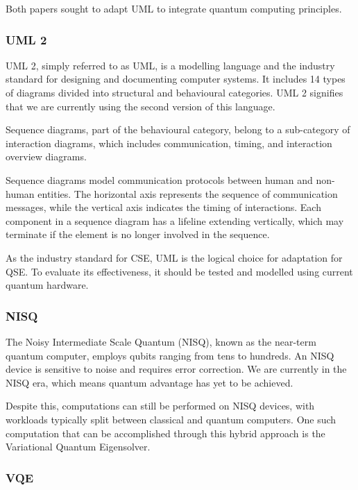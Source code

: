 \documentclass{article}
\newcounter{subsubsubsection}[subsubsection]
\begin{document}
Both papers sought to adapt UML to integrate quantum computing principles. 

\subsubsection{UML 2}

UML 2, simply referred to as UML, is a modelling language and the industry standard for designing and documenting computer systems. It includes 14 types of diagrams divided into structural and behavioural categories. UML 2 signifies that we are currently using the second version of this language. 

Sequence diagrams, part of the behavioural category, belong to a sub-category of interaction diagrams, which includes communication, timing, and interaction overview diagrams.

Sequence diagrams model communication protocols between human and non-human entities. The horizontal axis represents the sequence of communication messages, while the vertical axis indicates the timing of interactions. Each component in a sequence diagram has a lifeline extending vertically, which may terminate if the element is no longer involved in the sequence. 

As the industry standard for CSE, UML is the logical choice for adaptation for QSE. To evaluate its effectiveness, it should be tested and modelled using current quantum hardware. 



\subsubsection{NISQ}

The Noisy Intermediate Scale Quantum (NISQ), known as the near-term quantum computer, employs qubits ranging from tens to hundreds. An NISQ device is sensitive to noise and requires error correction. We are currently in the NISQ era, which means quantum advantage has yet to be achieved.

Despite this, computations can still be performed on NISQ devices, with workloads typically split between classical and quantum computers. One such computation that can be accomplished through this hybrid approach is the Variational Quantum Eigensolver. 

\subsubsection{VQE}
\end{document}
